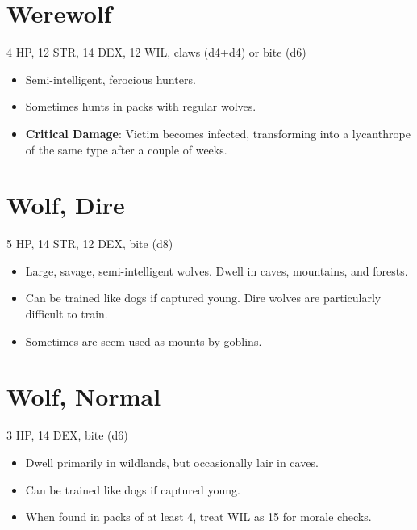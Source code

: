 \documentclass[
  10pt,
  american,
]{article}
\begin{document}
\hypertarget{werewolf}{%
\section{Werewolf}\label{werewolf}}

4 HP, 12 STR, 14 DEX, 12 WIL, claws (d4+d4) or bite (d6)

\begin{samepage}
\begin{itemize}
\setlength\itemsep{-.5em}
\item Semi-intelligent, ferocious hunters.
\item Sometimes hunts in packs with regular wolves.
\item \textbf{Critical Damage}: Victim becomes infected, transforming into a lycanthrope of the same type after a couple of weeks.
\end{itemize}
\end{samepage}

\hypertarget{wolf-dire}{%
\section{Wolf, Dire}\label{wolf-dire}}

5 HP, 14 STR, 12 DEX, bite (d8)

\begin{samepage}
\begin{itemize}
\setlength\itemsep{-.5em}
\item Large, savage, semi-intelligent wolves. Dwell in caves, mountains, and forests.
\item Can be trained like dogs if captured young. Dire wolves are particularly difficult to train.
\item Sometimes are seem used as mounts by goblins.
\end{itemize}
\end{samepage}

\hypertarget{wolf-normal}{%
\section{Wolf, Normal}\label{wolf-normal}}

3 HP, 14 DEX, bite (d6)

\begin{samepage}
\begin{itemize}
\setlength\itemsep{-.5em}
\item Dwell primarily in wildlands, but occasionally lair in caves.
\item Can be trained like dogs if captured young.
\item When found in packs of at least 4, treat WIL as 15 for morale checks.
\end{itemize}
\end{samepage}
\end{document}
